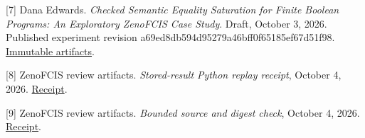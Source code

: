 \documentclass[11pt]{article}
\begin{document}
[7] Dana Edwards. \emph{Checked Semantic Equality Saturation for Finite Boolean Programs: An Exploratory ZenoFCIS Case Study}. Draft, October 3, 2026. Published experiment revision a69ed8db594d95279a46bff0f65185ef67d51f98. \href{\detokenize{https://github.com/TheDarkLightX/ZenoFCIS/tree/a69ed8db594d95279a46bff0f65185ef67d51f98/experiments/semantic-egraphs}}{Immutable artifacts}.

[8] ZenoFCIS review artifacts. \emph{Stored-result Python replay receipt}, October 4, 2026. \href{\detokenize{../evidence/v2_1_egraphs/replay-20261004.json}}{Receipt}.

[9] ZenoFCIS review artifacts. \emph{Bounded source and digest check}, October 4, 2026. \href{\detokenize{../evidence/v2_1_egraphs/source-check-20261004.json}}{Receipt}.
\end{document}
